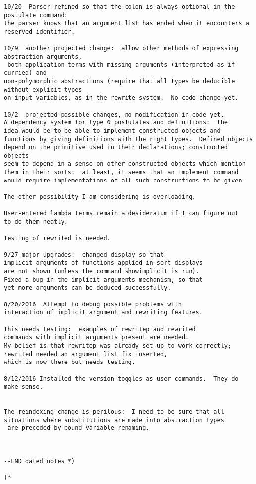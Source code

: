 \documentclass{article}
\begin{document}
{\begin{verbatim}
10/20  Parser refined so that the colon is always optional in the postulate command:
the parser knows that an argument list has ended when it encounters a reserved identifier.

10/9  another projected change:  allow other methods of expressing abstraction arguments,
 both application terms with missing arguments (interpreted as if curried) and 
non-polymorphic abstractions (require that all types be deducible without explicit types 
on input variables, as in the rewrite system.  No code change yet.

10/2  projected possible changes, no modification in code yet.
A dependency system for type 0 postulates and definitions:  the
idea would be to be able to implement constructed objects and
functions by giving definitions with the right types.  Defined objects
depend on the primitive used in their declarations; constructed objects
seem to depend in a sense on other constructed objects which mention
them in their sorts:  at least, it seems that an implement command
would require implementations of all such constructions to be given.

The other possibility I am considering is overloading.

User-entered lambda terms remain a desideratum if I can figure out
to do them neatly.

Testing of rewrited is needed.

9/27 major upgrades:  changed display so that 
implicit arguments of functions applied in sort displays
are not shown (unless the command showimplicit is run).  
Fixed a bug in the implicit arguments mechanism, so that
yet more arguments can be deduced successfully.

8/20/2016  Attempt to debug possible problems with 
interaction of implicit argument and rewriting features.

This needs testing:  examples of rewritep and rewrited 
commands with implicit arguments present are needed.
My belief is that rewritep was already set up to work correctly;  
rewrited needed an argument list fix inserted,
which is now there but needs testing.

8/12/2016 Installed the version toggles as user commands.  They do make sense.


The reindexing change is perilous:  I need to be sure that all
situations where substitutions are made into abstraction types
 are preceded by bound variable renaming.



--END dated notes *)

(*

\end{verbatim}}
\end{document}
